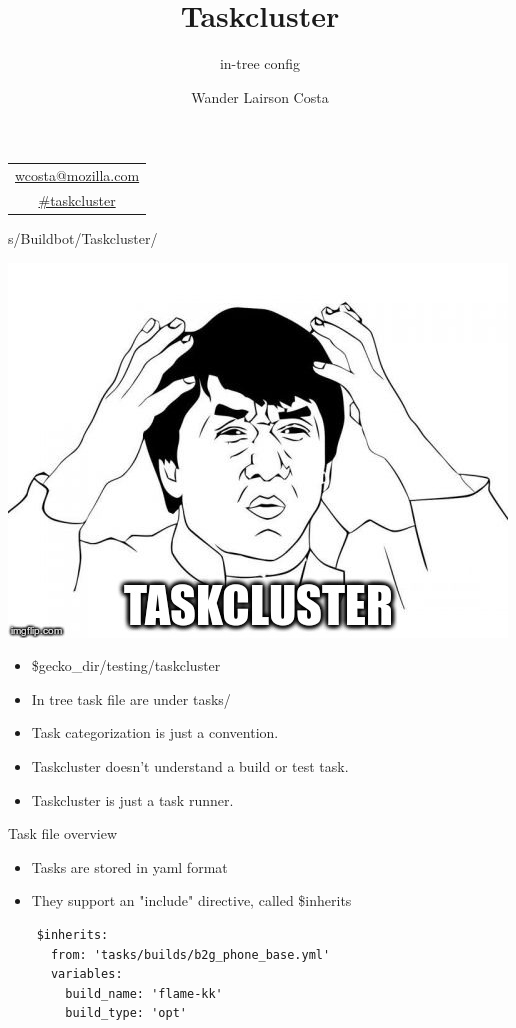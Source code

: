 \documentclass[pdf]{beamer}
\title[Taskcluster in-tree]{Taskcluster}
\subtitle{in-tree config}
\author{{\Large Wander Lairson Costa}}
\institute{{\large Taskcluster team}}
\date{}
\begin{document}
\begin{frame}
  \titlepage
  \begin{center}
    \begin{tabular}{c}
      \href{mailto:wcosta@mozilla.com}{wcosta@mozilla.com} \\
      \url{\#taskcluster} \\
    \end{tabular}
  \end{center}
\end{frame}

\begin{frame}{s/Buildbot/Taskcluster/}
  \begin{center}
    \includegraphics[scale=0.25]{img/wth.jpg}
  \end{center}
  \begin{itemize}
    \item \$gecko\_dir/testing/taskcluster
    \item In tree task file are under tasks/
    \item Task categorization is just a convention.
    \item Taskcluster doesn't understand a build or test task.
    \item Taskcluster is just a task runner.
  \end{itemize}
\end{frame}

\begin{frame}[fragile]{Task file overview}
  \begin{itemize}
    \item Tasks are stored in yaml format
    \item They support an "include" directive, called \$inherits
  \end{itemize}
  \begin{lstlisting}
    $inherits:
      from: 'tasks/builds/b2g_phone_base.yml'
      variables:
        build_name: 'flame-kk'
        build_type: 'opt'
  \end{lstlisting}
\end{frame}
\end{document}

